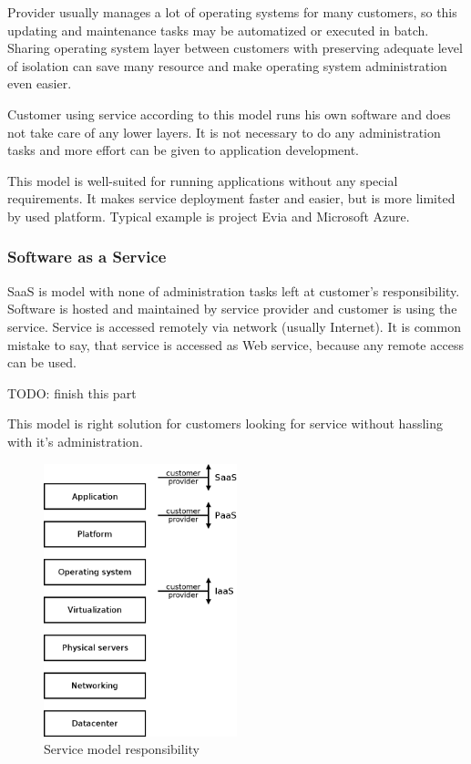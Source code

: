 Provider usually manages a lot of operating systems for many customers, so  this updating and maintenance tasks may be automatized or executed in batch. Sharing operating system layer between customers with preserving adequate level of isolation can save many resource and make operating system administration even easier.

Customer using service according to this model runs his own software and does not take care of any lower layers. It is not necessary to do any administration tasks and more effort can be given to application development. 

This model is well-suited for running applications without any special requirements. It makes service deployment faster and easier, but is more limited by used platform. 
Typical example is project Evia and Microsoft Azure.

\subsubsection{Software as a Service}
\Ac{SaaS} is model with none of administration tasks left at customer's responsibility. Software is hosted and maintained by service provider and customer is using the service. Service is accessed remotely via network (usually Internet). It is common mistake to say, that service is accessed as Web service, because any remote access can be used. 

TODO: finish this part

This model is right solution for customers looking for service without hassling with it's administration.

\begin{figure}[htb]
	\begin{center}
	\includegraphics[width=0.5\textwidth]{service-models.png}
	\end{center}
	\caption{Service model responsibility}
	\label{img:service-models}
\end{figure}

